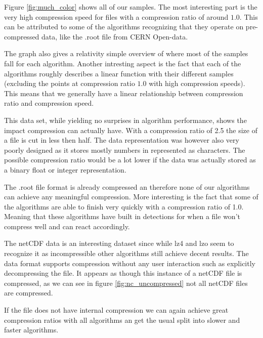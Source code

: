 \documentclass[
	12pt,
	a4paper,
	BCOR10mm,
	DIV14,
	listof=totoc,
	bibliography=totoc,
	headsepline
]{scrreprt}
\begin{document}

Figure \ref{fig:much_color} shows all of our samples. The most interesting part is the very high compression speed for files with a compression ratio of around $1.0$. This can be attributed to some of the algorithms recognizing that they operate on pre-compressed data, like the .root file from CERN Open-data.

The graph also gives a relativity simple overview of where most of the samples fall for each algorithm.
Another intresting aspect is the fact that each of the algorithms roughly describes a linear function with their different samples (excluding the points at compression ratio $1.0$ with high compression speeds).
This means that we generally have a linear relationship between compression ratio and compression speed.
\FloatBarrier



This data set, while yielding no surprises in algorithm performance, shows the impact compression can actually have. With a compression ratio of 2.5 the size of a file is cut in less then half.
The data representation was however also very poorly designed as it stores mostly numbers in represented as characters.
The possible compression ratio would be a lot lower if the data was actually stored as a binary float or integer representation.

\FloatBarrier

The .root file format is already compressed an therefore none of our algorithms can achieve any meaningful compression. More interesting is the fact that some of the algorithms are able to finish very quickly with a compression ratio of 1.0. 
Meaning that these algorithms have built in detections for when a file won't compress well and can react accordingly.  

\FloatBarrier

The netCDF data is an interesting dataset since while lz4 and lzo seem to recognize it as incompressible other algorithms still achieve decent results.
The data format supports compression without any user interaction such as explicitly decompressing the file. It appears as though this instance of a netCDF file is compressed, as we can see in figure \ref{fig:nc_uncompressed} not all netCDF files are compressed.

If the file does not have internal compression we can again achieve great compression ratios with all algorithms an get the usual split into slower and faster algorithms.

\FloatBarrier
\end{document}
